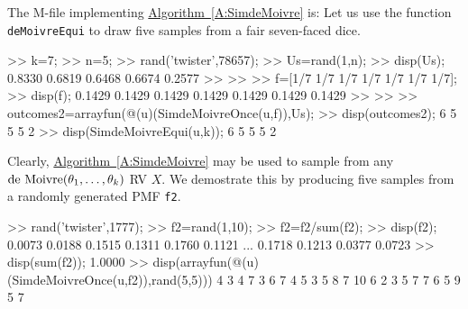 \begin{simulation}
The M-file implementing \hyperref[A:SimdeMoivre]{Algorithm~\ref*{A:SimdeMoivre}} is:
Let us use the function {\tt deMoivreEqui} to draw five samples from a fair seven-faced dice.
\begin{VrbM}
>> k=7; %
>> n=5; %
>> rand('twister',78657); %
>> Us=rand(1,n); %
>> disp(Us);
    0.8330    0.6819    0.6468    0.6674    0.2577
>> %
>> %
>> f=[1/7 1/7 1/7 1/7 1/7 1/7 1/7];
>> disp(f);
    0.1429    0.1429    0.1429    0.1429    0.1429    0.1429    0.1429
>> %
>> %
>> outcomes2=arrayfun(@(u)(SimdeMoivreOnce(u,f)),Us);
>> disp(outcomes2);
     6     5     5     5     2
>> disp(SimdeMoivreEqui(u,k)); %
     6     5     5     5     2
\end{VrbM}
Clearly, \hyperref[A:SimdeMoivre]{Algorithm~\ref*{A:SimdeMoivre}} may be used to sample from any $\mbox{{\rm de~Moivre}}(\theta_1,\ldots,\theta_k)$ RV $X$.  We demostrate this by producing five samples from a randomly generated PMF {\tt f2}.
\begin{VrbM}
>> rand('twister',1777); %
>> f2=rand(1,10); %
>> f2=f2/sum(f2); %
>> disp(f2); %
    0.0073    0.0188    0.1515    0.1311    0.1760    0.1121    ...
    0.1718    0.1213    0.0377    0.0723
>> disp(sum(f2)); %
    1.0000
>> disp(arrayfun(@(u)(SimdeMoivreOnce(u,f2)),rand(5,5))) %
     4     3     4     7     3
     6     7     4     5     3
     5     8     7    10     6
     2     3     5     7     7
     6     5     9     5     7
\end{VrbM}
\end{simulation}

